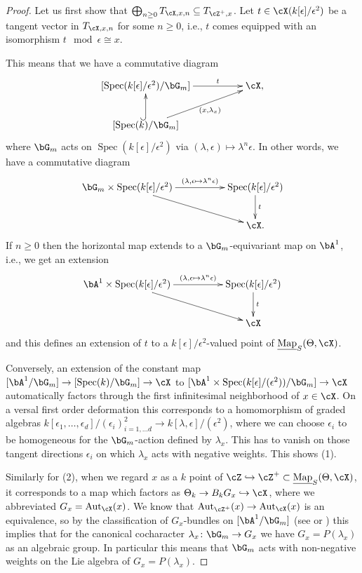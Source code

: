 \documentclass[a4paper]{amsart}
\numberwithin{equation}{section}
\theoremstyle{plain}
\theoremstyle{definition}
\DeclareMathOperator{\Spec}{Spec}
\DeclareMathOperator{\Aut}{Aut}
\newcommand{\uMap}{\underline{{\rm Map}}}
\newcommand{\co}{\colon}
\begin{document}
\begin{proof}	
	Let us first show that $\bigoplus_{n\geq 0}T_{\cX,x,n}\subseteq T_{\cZ^+,x}$.
	Let $t\in \cX(k[\epsilon]/\epsilon^2)$ be a tangent vector in $T_{\cX,x,n}$ for some $n\geq 0$, i.e., $t$ comes equipped with an isomorphism $t \mod \epsilon \cong x$. 
	
	This means that we have a commutative diagram 
	$$\xymatrix@C=5em{[\Spec(k[\epsilon]/\epsilon^2)/\bG_m]\ar[r]^-t& \cX,\\ [\Spec(k)/\bG_m] \ar[ur]_-{(x,\lambda_x)}\ar@{^(->}[u] & }$$ where $\bG_m$ acts on $\Spec(k[\epsilon]/\epsilon^2)$ via $(\lambda,\epsilon) \mapsto \lambda^n\epsilon$. In other words, we have a commutative diagram
	$$\xymatrix@C=5em{
		\bG_m \times \Spec(k[\epsilon]/\epsilon^2) \ar[r]^-{(\lambda,\epsilon \mapsto \lambda^n \epsilon)} \ar[dr] & \Spec(k[\epsilon]/\epsilon^2) \ar[d]^t \\
		& \cX.
	}$$
	If $n\geq 0$ then the horizontal map extends to {a} {$\bG_m$-equivariant map on} $\bA^1$, i.e., we get an extension 
	$$\xymatrix@C=5em{
		\bA^1 \times \Spec(k[\epsilon]/\epsilon^2) \ar[r]^-{(\lambda,\epsilon \mapsto \lambda^n \epsilon)} \ar[dr] & \Spec(k[\epsilon]/\epsilon^2) \ar[d]^t \\
		& \cX
	}$$
	and this defines an extension of $t$ to a $k[\epsilon]/\epsilon^2$-valued point of $\uMap_S(\Theta,\cX)$.
	
	Conversely, an extension of the constant map $[\bA^1/\bG_m] \to [\Spec(k)/\bG_m] \to \cX$ to $[\bA^1 \times \Spec( k[\epsilon]/(\epsilon^2)) /\bG_m] \to \cX$ automatically factors through the first infinitesimal neighborhood of $x\in \cX$. On a versal first order deformation this corresponds to a homomorphism of graded algebras $k[\epsilon_1,\dots,\epsilon_d]/(\epsilon_i)_{i=1,\dots d}^2 \to k[\lambda,\epsilon]/(\epsilon^2)$, where we can choose $\epsilon_i$ to be homogeneous for the $\bG_m$-action defined by $\lambda_x$.  
	This has to vanish on those tangent directions $\epsilon_i$ on which $\lambda_x$ acts with negative weights. This shows (1).
	
	Similarly for (2), when we regard $x$ as a $k$ point of $\cZ \hookrightarrow \cZ^+ \subset \uMap_S(\Theta,\cX)$, it corresponds to a map which factors as $\Theta_k \to B_k G_x\hookrightarrow \cX$, where we abbreviated $G_x=\Aut_{\cX}(x)$. We know that $\Aut_{{\cZ^+}}(x) \to \Aut_{\cX}(x)$ is an equivalence, so by the classification of $G_x$-bundles on $[\bA^1/\bG_m]$ (see \cite[Lem.~1.7]{heinloth-stability} or \cite[Prop.~A.0.1]{hlinstability}) 
	this implies that for the canonical cocharacter $\lambda_x \co \bG_m \to G_x$ we have $G_x=P(\lambda_x)$ as an algebraic group. In particular this means that $\bG_m$ acts with non-negative weights on the Lie algebra of $G_x=P(\lambda_x)$.
\end{proof}
\end{document}

